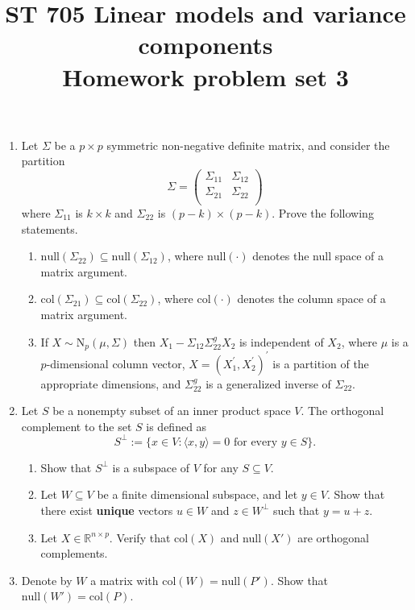 \documentclass[11pt]{article}
\title{ST 705 Linear models and variance components \\ 
        Homework problem set 3}
\begin{document}
\maketitle

\begin{enumerate}


\item  Let $\Sigma$ be a $p\times p$ symmetric non-negative definite matrix, and consider the partition
\[
\Sigma = 
\begin{pmatrix}
\Sigma_{11} & \Sigma_{12} \\
\Sigma_{21} & \Sigma_{22} \\
\end{pmatrix}
\]
where $\Sigma_{11}$ is $k\times k$ and $\Sigma_{22}$ is $(p-k)\times(p-k)$.  Prove the following statements.
\begin{enumerate}
\item $\text{null}(\Sigma_{22}) \subseteq \text{null}(\Sigma_{12})$, where $\text{null}(\cdot)$ denotes the null space of a matrix argument.
\item $\text{col}(\Sigma_{21}) \subseteq \text{col}(\Sigma_{22})$, where $\text{col}(\cdot)$ denotes the column space of a matrix argument.
\item If $X \sim \text{N}_{p}(\mu,\Sigma)$ then $X_{1} - \Sigma_{12}\Sigma_{22}^{g}X_{2}$ is independent of $X_{2}$, where $\mu$ is a $p$-dimensional column vector, $X = (X^{\prime}_{1}, X^{\prime}_{2})^{\prime}$ is a partition of the appropriate dimensions, and $\Sigma_{22}^{g}$ is a generalized inverse of $\Sigma_{22}$.
\end{enumerate}

\item Let $S$ be a nonempty subset of an inner product space $V$.  The orthogonal complement to the set $S$ is defined as
\[
S^{\perp} := \{x \in V : \langle x,y\rangle = 0 \text{ for every } y \in S\}.
\]
\begin{enumerate}
\item Show that $S^{\perp}$ is a subspace of $V$ for any $S \subseteq V$.
\item Let $W \subseteq V$ be a finite dimensional subspace, and let $y \in V$.  Show that there exist \textbf{unique} vectors $u \in W$ and $z \in W^{\perp}$ such that $y = u + z$.
\item Let $X \in \mathbb{R}^{n\times p}$.  Verify that col$(X)$ and null$(X')$ are orthogonal complements.
\end{enumerate}

\item Denote by $W$ a matrix with $\text{col}(W) = \text{null}(P')$.  Show that $\text{null}(W') = \text{col}(P)$. 


\end{enumerate}
\end{document}
